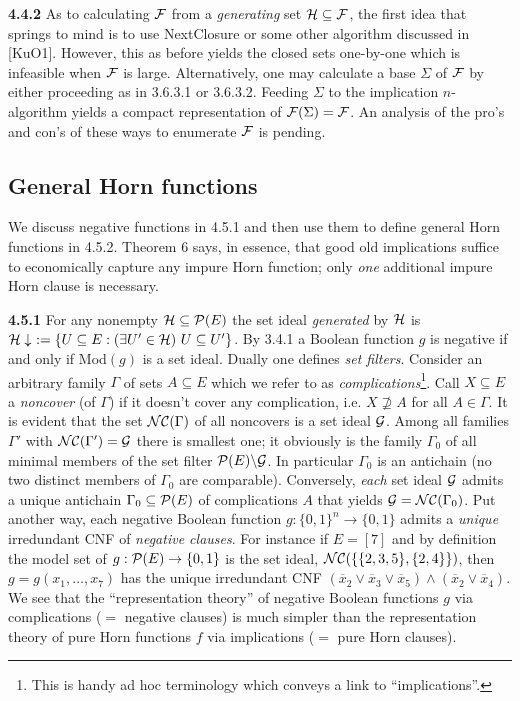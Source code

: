 \documentclass[11pt]{article}
\newcommand{\ol}{\overline}
\newcommand{\ra}{\rightarrow}
\begin{document}
{\bf 4.4.2} As to calculating ${\cal F}$ from a {\it generating} set ${\cal H} \subseteq {\cal F}$, the first idea that springs to mind is to use NextClosure or some other algorithm discussed in [KuO1].  However, this as before yields the closed sets one-by-one which is infeasible when ${\cal F}$ is large. Alternatively, one may calculate a base $\Sigma$ of ${\cal F}$ by either proceeding as in 3.6.3.1 or 3.6.3.2. Feeding $\Sigma$ to the implication $n$-algorithm yields a compact representation of ${\cal F}(\Sigma) = {\cal F}$. An analysis of the pro's and con's of these ways to enumerate ${\cal F}$ is  pending.



\subsection{General Horn functions}


We discuss negative functions in 4.5.1 and then use them to define general Horn functions in 4.5.2. Theorem 6 says, in essence, that good old implications suffice to economically capture any impure Horn function; only {\it one} additional impure Horn clause is necessary.

{\bf 4.5.1} For any nonempty ${\cal H} \subseteq {\cal P}(E)$ the set ideal {\it generated} by ${\cal H}$ is ${\cal H}\downarrow \ : = \{U \subseteq E: (\exists U'\in {\cal H}) \ U \subseteq U'\}$. By 3.4.1 a Boolean function $g$ is negative if and only if Mod$(g)$ is a set ideal. Dually one defines {\it set filters}. Consider an arbitrary family $\Gamma$ of sets $A \subseteq E$ which we refer to as {\it complications}\footnote{This is handy ad hoc terminology which conveys a link to ``implications''.}.
Call $X \subseteq E$ a {\it noncover} (of $\Gamma$) if it doesn't cover any complication, i.e. $X \not\supseteq A$ for all $A \in \Gamma$. It is evident that the set ${\cal N}{\cal C}(\Gamma)$ of all noncovers is a set ideal ${\cal G}$. 
Among all families $\Gamma'$ with ${\cal N}{\cal C}(\Gamma') = {\cal G}$ there is smallest one; it obviously is the family $\Gamma_0$ of all minimal members of the set filter ${\cal P}(E)\backslash {\cal G}$. In particular $\Gamma_0$ is an antichain (no two distinct members of $\Gamma_0$ are comparable). Conversely, {\it each} set ideal ${\cal G}$ admits a unique antichain $\Gamma_0 \subseteq {\cal P}(E)$ of complications $A$ that yields ${\cal G}= {\cal N}{\cal C}(\Gamma_0)$. Put another way, each negative Boolean function $g: \{0,1\}^n \ra \{0,1\}$ admits a {\it unique} irredundant CNF of {\it negative clauses}. For instance if $E = [7]$ and by definition the model set of $g: {\cal P}(E) \ra \{0,1\}$ is the set ideal, ${\cal N} {\cal C}(\{\{2,3,5\}, \{2, 4\}\})$, then $g = g(x_1, \ldots, x_7)$ has the unique irredundant CNF  $(\ol{x}_2 \vee \ol{x}_3 \vee \ol{x}_5) \wedge (\ol{x}_2 \vee \ol{x}_4)$. We see that the ``representation theory'' of negative Boolean functions $g$ via complications ($=$ negative clauses) is much simpler than the representation theory of pure Horn functions $f$ via implications ($=$ pure Horn clauses).
\end{document}
